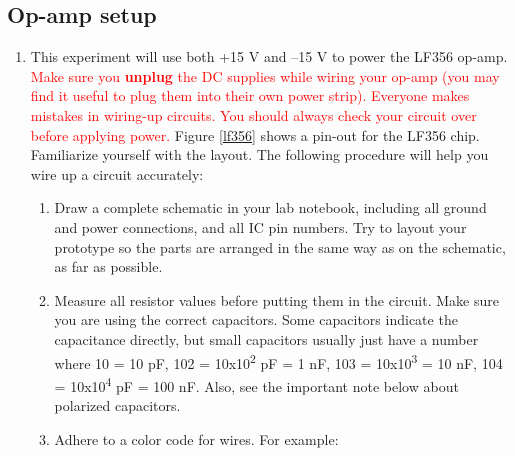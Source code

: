 \documentclass[10pt]{PhysLab1C} %
\begin{document}
\subsection{Op-amp setup}


\begin{enumerate}
\item
  This experiment will use both +15 V and --15 V to power the LF356
  op-amp. \textcolor{red}{Make sure you \textbf{unplug} the DC supplies while wiring
  your op-amp (you may find it useful to plug them into their own power
  strip). Everyone makes mistakes in wiring-up circuits. You should
  always check your circuit over before applying power.} Figure \ref{lf356} shows a
  pin-out for the LF356 chip. Familiarize yourself with the layout. The
  following procedure will help you wire up a circuit accurately:

  \begin{enumerate}
  \item
    Draw a complete schematic in your lab notebook, including all ground
    and power connections, and all IC pin numbers. Try to layout your
    prototype so the parts are arranged in the same way as on the
    schematic, as far as possible.
  \item
    Measure all resistor values before putting them in the circuit. Make
    sure you are using the correct capacitors. Some capacitors indicate
    the capacitance directly, but small capacitors usually just have a
    number where 10 = 10 pF, 102 = 10x10\textsuperscript{2} pF = 1 nF,
    103 = 10x10\textsuperscript{3} = 10 nF, 104 =
    10x10\textsuperscript{4} pF = 100 nF. Also, see the important note
    below about polarized capacitors.
  \item
    Adhere to a color code for wires. For example:


\end{enumerate}
\end{enumerate}
\end{document}
